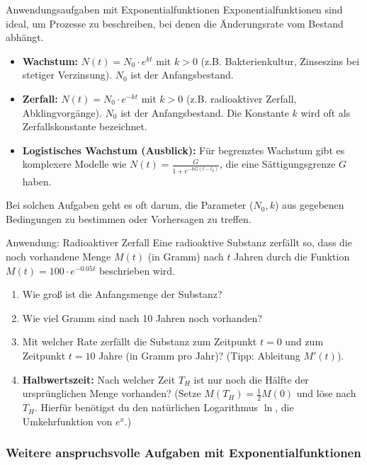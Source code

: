 \begin{tippumgebung}{Anwendungsaufgaben mit Exponentialfunktionen}
Exponentialfunktionen sind ideal, um Prozesse zu beschreiben, bei denen die Änderungsrate vom Bestand abhängt.
\begin{itemize}
    \item \textbf{Wachstum:} $N(t) = N_0 \cdot e^{kt}$ mit $k>0$ (z.B. Bakterienkultur, Zinseszins bei stetiger Verzinsung). $N_0$ ist der Anfangsbestand.
    \item \textbf{Zerfall:} $N(t) = N_0 \cdot e^{-kt}$ mit $k>0$ (z.B. radioaktiver Zerfall, Abklingvorgänge). $N_0$ ist der Anfangsbestand. Die Konstante $k$ wird oft als Zerfallskonstante bezeichnet.
    \item \textbf{Logistisches Wachstum (Ausblick):} Für begrenztes Wachstum gibt es komplexere Modelle wie $N(t) = \frac{G}{1+e^{-kG(t-t_0)}}$, die eine Sättigungsgrenze $G$ haben.
\end{itemize}
Bei solchen Aufgaben geht es oft darum, die Parameter ($N_0, k$) aus gegebenen Bedingungen zu bestimmen oder Vorhersagen zu treffen.
\end{tippumgebung}

\begin{aufgabenumgebung}{Anwendung: Radioaktiver Zerfall}
Eine radioaktive Substanz zerfällt so, dass die noch vorhandene Menge $M(t)$ (in Gramm) nach $t$ Jahren durch die Funktion $M(t) = 100 \cdot e^{-0.05t}$ beschrieben wird.
\begin{enumerate}
    \item Wie groß ist die Anfangsmenge der Substanz?
    \item Wie viel Gramm sind nach 10 Jahren noch vorhanden?
    \item Mit welcher Rate zerfällt die Substanz zum Zeitpunkt $t=0$ und zum Zeitpunkt $t=10$ Jahre (in Gramm pro Jahr)? (Tipp: Ableitung $M'(t)$).
    \item \textbf{Halbwertszeit:} Nach welcher Zeit $T_H$ ist nur noch die Hälfte der ursprünglichen Menge vorhanden? (Setze $M(T_H) = \frac{1}{2}M(0)$ und löse nach $T_H$. Hierfür benötigst du den natürlichen Logarithmus $\ln$, die Umkehrfunktion von $e^x$.)
\end{enumerate}
\end{aufgabenumgebung}


\subsubsection{Weitere anspruchsvolle Aufgaben mit Exponentialfunktionen}
\label{subsubsec:exp_anwendungen_vertiefung}

